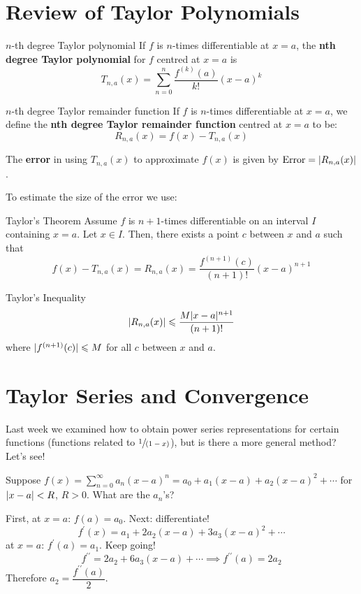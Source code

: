 \setcounter{section}{4}
\section{Review of Taylor Polynomials}
\begin{Definition}{$ n $-th degree Taylor polynomial}{}
    If $ f $ is $ n $-times differentiable at $ x=a $,
    the \textbf{nth degree Taylor polynomial} for $ f $
    centred at $ x=a $ is
    \[ T_{n,a}(x)=\sum\limits_{n=0}^{n} \frac{f^{(k)}(a)}{k!} (x-a)^k \]
\end{Definition}

\begin{Definition}{$ n $-th degree Taylor remainder function}{}
    If $ f $ is $ n $-times differentiable at $ x=a $, we define
    the \textbf{nth degree Taylor remainder function} centred at
    $ x=a $ to be:
    \[ R_{n,a}(x)=f(x)-T_{n,a}(x) \]
\end{Definition}
The \textbf{error} in using $ T_{n,a}(x) $ to approximate
$ f(x) $ is given by $ \text{Error}=\lvert R_{n,a}(x)\rvert $.

To estimate the size of the error we use:
\begin{Theorem}{Taylor's Theorem}{}
    Assume $ f $ is $ n+1 $-times differentiable on an interval
    $ I $ containing $ x=a $. Let $ x\in I $. Then, there exists
    a point $ c $ between $ x $ and $ a $ such that
    \[ f(x)-T_{n,a}(x)=R_{n,a}(x)=
        \frac{f^{(n+1)}(c)}{(n+1)!}(x-a)^{n+1}  \]
\end{Theorem}

\begin{Corollary}{Taylor's Inequality}{}
    \[ \lvert R_{n,a}(x)\rvert\leqslant \frac{M\lvert x-a\rvert^{n+1}}{(n+1)!} \]
    where $ \lvert f^{(n+1)}(c)\rvert\leqslant M $ for all $ c $
    between $ x $ and $ a $.
\end{Corollary}

\setcounter{section}{6}
\section{Taylor Series and Convergence}
Last week we examined how to obtain power series representations
for certain functions (functions related to $ \sfrac{1}{(1-x)} $),
but is there a more general method? Let's see!

Suppose $ f(x)=\sum\limits_{n=0}^{\infty} a_n(x-a)^n=a_0+a_1(x-a)+a_2(x-a)^2+\cdots $
for $ \lvert x-a\rvert<R $, $ R>0 $. What are the $ a_n $'s?

First, at $ x=a $: $ f(a)=a_0 $. Next: differentiate!
\[ f^\prime(x)=a_1+2a_2(x-a)+3a_3(x-a)^2+\cdots \]
at $ x=a $: $ f^\prime(a)=a_1 $. Keep going!
\[ f^{\prime\prime}=2a_2+6a_3(x-a)+\cdots\implies f^{\prime\prime}(a)=2a_2 \]
Therefore $ a_2=\dfrac{f^{\prime\prime}(a)}{2} $.

